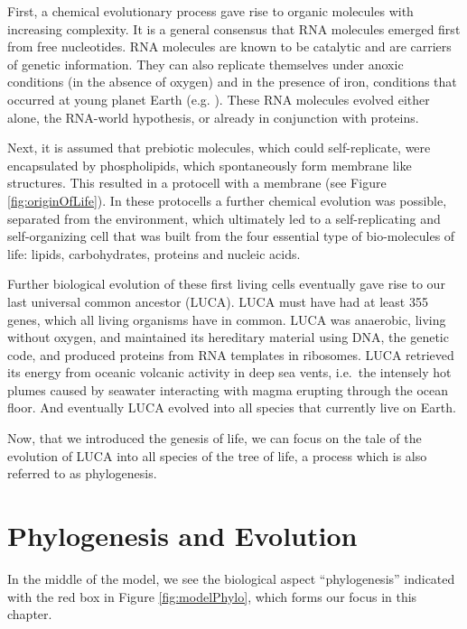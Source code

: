 \documentclass[
  11pt,
]{book}
\begin{document}
First, a chemical evolutionary process gave rise to organic molecules with increasing complexity. It is a general consensus that RNA molecules emerged first from free nucleotides. RNA molecules are known to be catalytic and are carriers of genetic information. They can also replicate themselves under anoxic conditions (in the absence of oxygen) and in the presence of iron, conditions that occurred at young planet Earth (e.g. \citet{Williams2013}). These RNA molecules evolved either alone, the RNA-world hypothesis, or already in conjunction with proteins.

Next, it is assumed that prebiotic molecules, which could self-replicate, were encapsulated by phospholipids, which spontaneously form membrane like structures. This resulted in a protocell with a membrane (see Figure \ref{fig:originOfLife}).
In these protocells a further chemical evolution was possible, separated from the environment, which ultimately led to a self-replicating and self-organizing cell that was built from the four essential type of bio-molecules of life: lipids, carbohydrates, proteins and nucleic acids.

Further biological evolution of these first living cells eventually gave rise to our last universal common ancestor (LUCA).
LUCA must have had at least 355 genes, which all living organisms have in common.
LUCA was anaerobic, living without oxygen, and maintained its hereditary material using DNA, the genetic code, and produced proteins from RNA templates in ribosomes. LUCA retrieved its energy from oceanic volcanic activity in deep sea vents, i.e.~the intensely hot plumes caused by seawater interacting with magma erupting through the ocean floor. And eventually LUCA evolved into all species that currently live on Earth.

Now, that we introduced the genesis of life, we can focus on the tale of the evolution of LUCA into all species of the tree of life, a process which is also referred to as phylogenesis.

\hypertarget{phylogenesis-and-evolution}{%
\chapter{Phylogenesis and Evolution}\label{phylogenesis-and-evolution}}

In the middle of the model, we see the biological aspect ``phylogenesis'' indicated with the red box in Figure \ref{fig:modelPhylo}, which forms our focus in this chapter.
\end{document}
